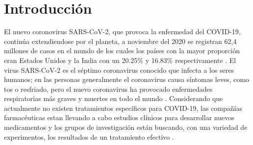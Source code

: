 \documentclass[12pt]{article}
\begin{document}
\tableofcontents
{}








\newpage

\listoffigures

\newpage




\newpage


\section{Introducción}

El nuevo coronovirus SARS-CoV-2, que provoca la enfermedad del COVID-19, contin\'ua extendiendose por el planeta,
a noviembre del 2020 se registran 62,4 millones de casos en el mundo de los cuales los pa\'ises con la mayor proporci\'on eran Estados Unidos y la  India con un 20.25\% y 16.83\% respectivamente \cite{6}. El virus SARS-CoV-2 es el s\'eptimo coronavirus conocido que infecta a los seres humanos; en las personas generalmente el coronavirus causa s\'intomas leves, como tos o resfriado, pero el nuevo coronavirus ha provocado enfermedades respiratorias m\'as graves y muertes en todo el mundo \cite{7}. Considerando que actualmente no existen tratamientos espec\'ificos para COVID-19, las compa\~{n}\'ias farmac\'euticas estan llevando a cabo estudios cl\'inicos para desarrollar nuevos medicamentos y los grupos de investigaci\'on est\'an buscando, con una variedad de experimentos, los resultados de un tratamiento efectivo \cite{8}.
\end{document}
